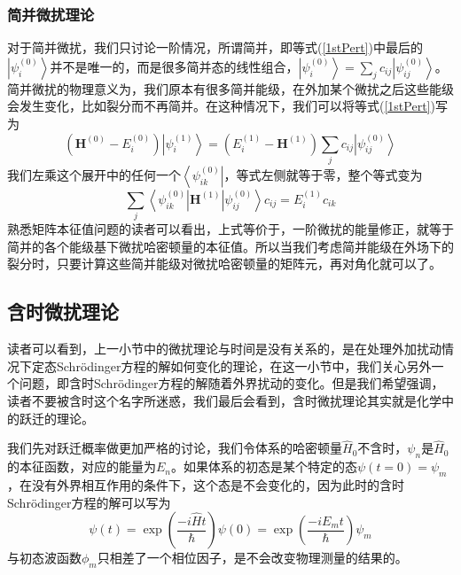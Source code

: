 \documentclass[12pt,a4paper,openany,twoside]{book}
\numberwithin{equation}{section}
\newcommand{\sch}{Schr\"odinger}
\begin{document}
          \subsubsection{简并微扰理论}
            对于简并微扰，我们只讨论一阶情况，所谓简并，即等式(\ref{1stPert})中最后的$\left|\psi_i^{(0)}\right\rangle$并不是唯一的，而是很多简并态的线性组合，$\left|\psi_i^{(0)}\right\rangle=\sum_j c_{ij}\left|\psi_{ij}^{(0)}\right\rangle$。简并微扰的物理意义为，我们原本有很多简并能级，在外加某个微扰之后这些能级会发生变化，比如裂分而不再简并。在这种情况下，我们可以将等式(\ref{1stPert})写为
            \begin{equation}
              \left(\mathbf{H}^{(0)}-E_{i}^{(0)}\right)\left|\psi_{i}^{(1)}\right\rangle=\left(E_{i}^{(1)}-\mathbf{H}^{(1)}\right) \sum_j c_{ij}\left|\psi_{ij}^{(0)}\right\rangle
            \end{equation}
            我们左乘这个展开中的任何一个$\left\langle\psi_{ik}^{(0)}\right|$，等式左侧就等于零，整个等式变为
            \begin{equation}
              \sum_j \left\langle\psi_{ik}^{(0)}\right|\mathbf{H}^{(1)}\left|\psi_{ij}^{(0)}\right\rangle c_{ij}=E_{i}^{(1)}c_{ik}
            \end{equation}
            熟悉矩阵本征值问题的读者可以看出，上式等价于，一阶微扰的能量修正，就等于简并的各个能级基下微扰哈密顿量的本征值。所以当我们考虑简并能级在外场下的裂分时，只要计算这些简并能级对微扰哈密顿量的矩阵元，再对角化就可以了。
        \subsection{含时微扰理论}
          读者可以看到，上一小节中的微扰理论与时间是没有关系的，是在处理外加扰动情况下定态\sch 方程的解如何变化的理论，在这一小节中，我们关心另外一个问题，即含时\sch 方程的解随着外界扰动的变化。但是我们希望强调，读者不要被含时这个名字所迷惑，我们最后会看到，含时微扰理论其实就是化学中的跃迁的理论。

          我们先对跃迁概率做更加严格的讨论，我们令体系的哈密顿量$\hat{H}_0$不含时，$\psi_n$是$\hat{H}_0$的本征函数，对应的能量为$E_n$。如果体系的初态是某个特定的态$\psi(t=0)=\psi_m$，在没有外界相互作用的条件下，这个态是不会变化的，因为此时的含时\sch 方程的解可以写为
          \begin{equation}
            \psi(t) = \exp(\frac{-i\hat{H}t}{\hbar})\psi(0) = \exp(\frac{-iE_mt}{\hbar})\psi_m
          \end{equation}
          与初态波函数$\phi_m$只相差了一个相位因子，是不会改变物理测量的结果的。
          
\end{document}
